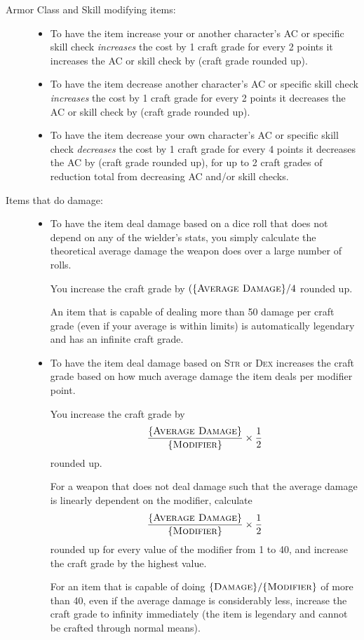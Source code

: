 \begin{description}
\begin{itemize}
	\end{itemize}
	\item[Armor Class and Skill modifying items:] \hfill
	\begin{itemize}
		\item To have the item increase your or another character's AC or specific skill check \emph{increases} the cost by 1 craft grade for every 2 points it increases the AC or skill check by (craft grade rounded up).
		\item To have the item decrease another character's AC or specific skill check \emph{increases} the cost by 1 craft grade for every 2 points it decreases the AC or skill check by (craft grade rounded up).
		\item To have the item decrease your own character's AC or specific skill check \emph{decreases} the cost by 1 craft grade for every 4 points it decreases the AC by (craft grade rounded up), for up to 2 craft grades of reduction total from decreasing AC and/or skill checks.
	\end{itemize}
	\item[Items that do damage:] \hfill
	\begin{itemize}
		\item To have the item deal damage based on a dice roll that does not depend on any of the wielder's stats, you simply calculate the theoretical average damage the weapon does over a large number of rolls.
		
		You increase the craft grade by $(\{ \textsc{Average Damage} \}/4$ rounded up.
		
		An item that is capable of dealing more than 50 damage per craft grade (even if your average is within limits) is automatically legendary and has an infinite craft grade.
		
		\item To have the item deal damage based on \textsc{Str} or \textsc{Dex} increases the craft grade based on how much average damage the item deals per modifier point.
		
		You increase the craft grade by $$\frac{\{ \textsc{Average Damage} \} }{\{ \textsc{Modifier} \}} \times \frac 1 2$$ rounded up.
		
		For a weapon that does not deal damage such that the average damage is linearly dependent on the modifier, calculate $$\frac{\{ \textsc{Average Damage} \} }{\{ \textsc{Modifier} \}} \times \frac 1 2$$ rounded up for every value of the modifier from 1 to 40, and increase the craft grade by the highest value.
		
		For an item that is capable of doing $\{ \textsc{Damage} \}/\{ \textsc{Modifier} \}$ of more than 40, even if the average damage is considerably less, increase the craft grade to infinity immediately (the item is legendary and cannot be crafted through normal means).
		

\end{itemize}
\end{description}
